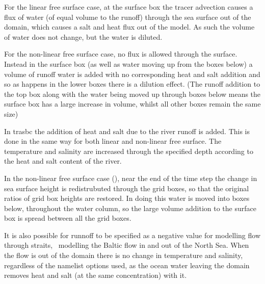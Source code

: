 \documentclass[../main/NEMO_manual]{subfiles}
\begin{document}
For the linear free surface case, at the surface box the tracer advection causes a flux of water
(of equal volume to the runoff) through the sea surface out of the domain,
which causes a salt and heat flux out of the model.
As such the volume of water does not change, but the water is diluted.

For the non-linear free surface case, no flux is allowed through the surface.
Instead in the surface box (as well as water moving up from the boxes below) a volume of runoff water is added with
no corresponding heat and salt addition and so as happens in the lower boxes there is a dilution effect.
(The runoff addition to the top box along with the water being moved up through
boxes below means the surface box has a large increase in volume, whilst all other boxes remain the same size)

In trasbc the addition of heat and salt due to the river runoff is added.
This is done in the same way for both linear and non-linear free surface.
The temperature and salinity are increased through the specified depth according to
the heat and salt content of the river.

In the non-linear free surface case (),
near the end of the time step the change in sea surface height is redistrubuted through the grid boxes,
so that the original ratios of grid box heights are restored.
In doing this water is moved into boxes below, throughout the water column,
so the large volume addition to the surface box is spread between all the grid boxes.

It is also possible for runnoff to be specified as a negative value for modelling flow through straits,
\ie\ modelling the Baltic flow in and out of the North Sea.
When the flow is out of the domain there is no change in temperature and salinity,
regardless of the namelist options used,
as the ocean water leaving the domain removes heat and salt (at the same concentration) with it.




\end{document}
